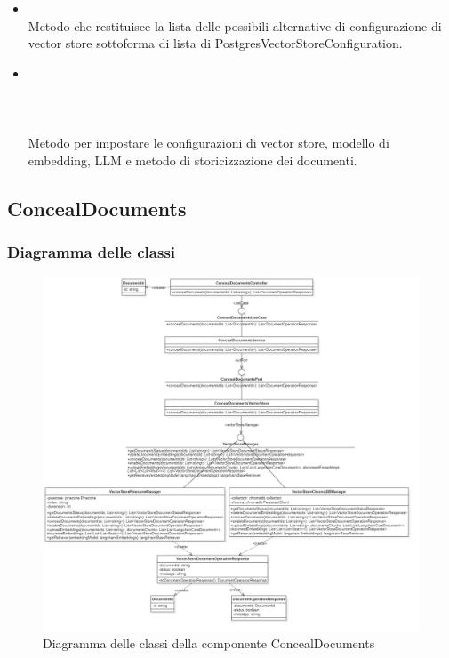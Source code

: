 \documentclass[10pt, a4paper]{article}
\begin{document}
\begin{itemize}
\begin{itemize}
            \item {}\\
            Metodo che restituisce la lista delle possibili alternative di configurazione di vector store sottoforma di lista di PostgresVectorStoreConfiguration.

            \item {} \\\\ \\ \\
            Metodo per impostare le configurazioni di vector store, modello di embedding, LLM e metodo di storicizzazione dei documenti.
        \end{itemize}
    \end{itemize}




\subsection{ConcealDocuments}
\subsubsection{Diagramma delle classi}
\begin{figure}[H]
    \centering        
    \includegraphics[width=16.5cm]{img/ConcealDocs.png}
    \caption{Diagramma delle classi della componente ConcealDocuments}
\end{figure}
\end{document}
